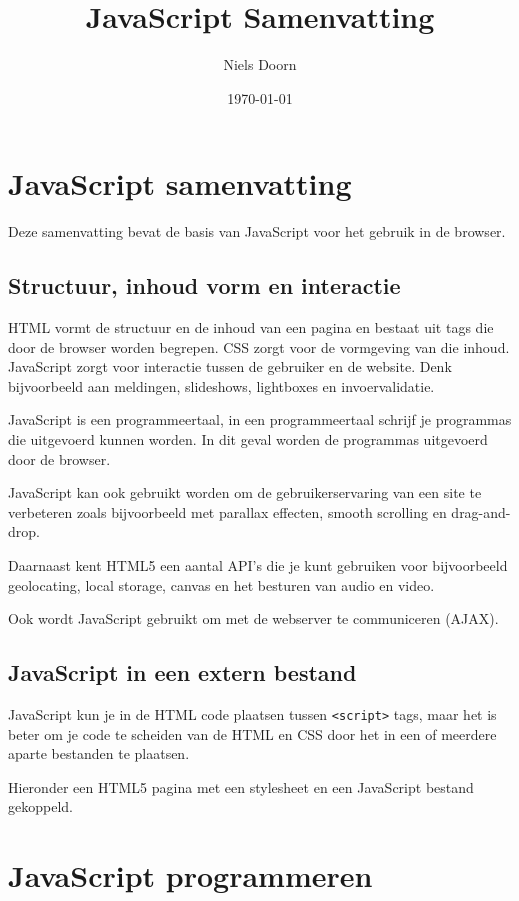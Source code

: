 \documentclass[8pt,pagesize,footinclude=false,headinclude=false]{scrartcl}
\title{JavaScript Samenvatting}
\author{Niels Doorn}
\date{\today}
\begin{document}
\ifpdf
{}
\else
{}
\fi

\begin{multicols*}{3}

\section*{JavaScript samenvatting}
Deze samenvatting bevat de basis van JavaScript voor het gebruik in de browser.

\subsection*{Structuur, inhoud vorm en interactie}
HTML vormt de structuur en de inhoud van een pagina en bestaat uit tags die door de browser worden begrepen. CSS zorgt voor de vormgeving van die inhoud. JavaScript zorgt voor interactie tussen de gebruiker en de website. Denk bijvoorbeeld aan meldingen, slideshows, lightboxes en invoervalidatie.

JavaScript is een programmeertaal, in een programmeertaal schrijf je programmas die uitgevoerd kunnen worden. In dit geval worden de programmas uitgevoerd door de browser.

JavaScript kan ook gebruikt worden om de gebruikerservaring van een site te verbeteren zoals bijvoorbeeld met parallax effecten, smooth scrolling en drag-and-drop.

Daarnaast kent HTML5 een aantal API's die je kunt gebruiken voor bijvoorbeeld geolocating, local storage, canvas en het besturen van audio en video.

Ook wordt JavaScript gebruikt om met de webserver te communiceren (AJAX).

\subsection*{JavaScript in een extern bestand}
JavaScript kun je in de HTML code plaatsen tussen \texttt{<script>} tags, maar het is beter om je code te scheiden van de HTML en CSS door het in een of meerdere aparte bestanden te plaatsen.

Hieronder een HTML5 pagina met een stylesheet en een JavaScript bestand gekoppeld.


\section*{JavaScript programmeren}


\end{multicols*}
\end{document}
